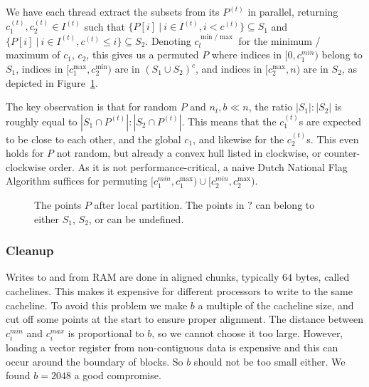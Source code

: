 We have each thread extract the subsets from its $P^{(t)}$ in parallel, 
returning $c_{1}^{(t)}, c_{2}^{(t)} \in I^{(t)}$ such that
$\{P[i] \ | \ i \in I^{(t)}, i < c^{(t)}\} \subseteq S_1$
and $\{P[i] \ | \ i \in I^{(t)}, c^{(t)} \leq i\} \subseteq S_2$.
Denoting $c_{l}^{\min / \max}$ for the minimum / maximum of $c_1$, $c_2$, this
gives us a permuted $P$ where indices in $[0, c_1^{min})$ belong to $S_1$,
indices in $[c_{1}^{\max}, c_2^{\min})$ are in $(S_1 \cup S_2)^c$, and
indices in $[c_2^{\max}, n)$ are in $S_2$, as depicted in 
Figure~\ref{fig:local_part}.

The key observation is that for random $P$ and $n_t, b \ll n$, the ratio 
$|S_1| : |S_2|$ is roughly equal to $|S_1 \cap P^{(t)}| : |S_2 \cap P^{(t)}|$.
This means that the $c_1^{(t)}$s are expected to be close to each other, and
the global $c_1$, and likewise for the $c_2^{(t)}$s. This even holds for $P$
not random, but already a convex hull listed in clockwise, or counter-clockwise
order. As it is not performance-critical, a naive Dutch National Flag Algorithm 
suffices for permuting $[c_1^{min}, c_1^{\max}) \cup [c_2^{min}, c_2^{\max})$.

\begin{figure}[ht]
    \caption{The points $P$ after local partition. The points in $?$ can
             belong to either $S_1$, $S_2$, or can be undefined.}
    \label{fig:local_part}
\end{figure}

\subsubsection{Cleanup}


Writes to and from RAM are done in aligned chunks, typically $64$ bytes, called
cachelines. This makes it expensive for different processors to write to the 
same cacheline. To avoid this problem we make $b$ a multiple of
the cacheline size, and cut off some points at the start to ensure proper
alignment. The distance between $c_i^{min}$ and $c_i^{max}$ is proportional
to $b$, so we cannot choose it too large. However, loading a vector register 
from non-contiguous data is expensive and this can occur around the boundary
of blocks. So $b$ should not be too small either. We found $b = 2048$ a good
compromise.
